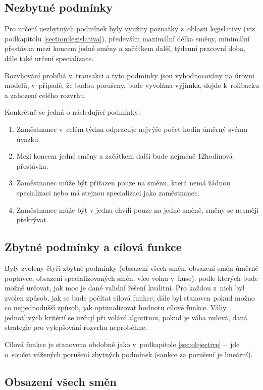 \documentclass[twoside]{ctuthesis}
\begin{document}
\subsection{Nezbytné podmínky}
Pro určení nezbytných podmínek byly využity poznatky z~oblasti legislativy (viz podkapitolu \ref{section:legislativa}), především maximální délka směny, minimální přestávka mezi koncem jedné směny a začátkem další, týdenní pracovní doba, dále také určení specializace.

Rozvhování probíhá v~transakci a tyto podmínky jsou vyhodnocovány na úrovni modelů, v~případě, že budou porušeny, bude vyvolána výjimka, dojde k~rollbacku a zahození celého rozvrhu.

Konkrétně se jedná o následující podmínky:

\begin{enumerate}
	\item Zaměstnanec v~celém týdnu odpracuje nejvýše počet hodin úměrný svému úvazku.
	\item Mezi koncem jedné směny a začátkem další bude nejméně 12hodinová přestávka.
	\item Zaměstnanec může být přiřazen pouze na směnu, která nemá žádnou specializaci nebo má stejnou specializaci jako zaměstnanec.
	\item Zaměstnanec může být v jednu chvíli pouze na jedné směně, směny se nesmějí překrývat.
\end{enumerate}

\subsection{Zbytné podmínky a cílová funkce}
Byly zvoleny čtyři zbytné podmínky (obsazení všech směn, obsazení směn úměrně poptávce, obsazení specializovaných směn, více volna v~kuse), podle kterých bude možné určovat, jak moc je dané validní řešení kvalitní. Pro každou z~nich byl zvolen způsob, jak se bude počítat cílová funkce, dále byl stanoven pokud možno co nejjednodušší způsob, jak optimalizovat hodnotu cílové funkce. Váhy jednotlivých kritérií se určují při volání algoritmu, pokud je váha nulová, daná strategie pro vylepšování rozvrhu neproběhne.

Cílová funkce je stanovena obdobně jako v~podkapitole \ref{sec:objective} – jde o~součet vážených porušení zbytných podmínek (sankce za porušení je lineární).

\subsection{Obsazení všech směn}
\end{document}
